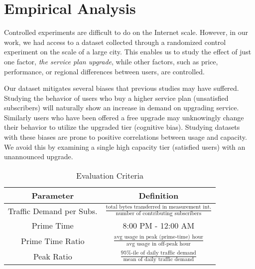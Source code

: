 \section{Empirical Analysis}\label{sec:analysis}


Controlled experiments are difficult to do on the Internet scale. However, in 
our work, we had access to a dataset collected through a randomized control 
experiment on the scale of a large city. This enables us to study the effect of 
just one factor, \emph{the service plan upgrade}, while other
factors, such as price, performance, or regional differences between users, are
controlled.

Our dataset mitigates several biases that previous studies may have 
suffered. Studying the behavior of users who buy a higher service plan
(unsatisfied subscribers) will naturally show an increase in demand on
upgrading service. Similarly users who have been offered a free upgrade
may unknowingly change their behavior to utilize the upgraded tier
(cognitive bias). Studying datasets with these biases are prone 
to positive correlations between usage and capacity. We avoid this by examining 
a single high capacity tier (satisfied users) with an unannounced upgrade.

\begin{table}[t]
\begin{tabular}{| c | c |}\hline
\textbf{Parameter} & \textbf{Definition}	\\\hline
Traffic Demand per Subs.& \(\frac{\text{total bytes transferred in 
measurement int.}}{\text{number of contributing subscribers}}\)	\\
Prime Time		& 8:00 PM - 12:00 AM   		\\
Prime Time Ratio 	& \( \frac{ \text{avg usage in peak (prime-time) 
hour}}{ \text{avg usage in off-peak hour}}\) 		\\
Peak Ratio 		& \(\frac{\text{95\%-ile of daily traffic 
demand}}{\text{mean of daily traffic demand}}\)	\\\hline
\end{tabular}
\caption{Evaluation Criteria}
\label{tab:eval-criteria}
\end{table}


